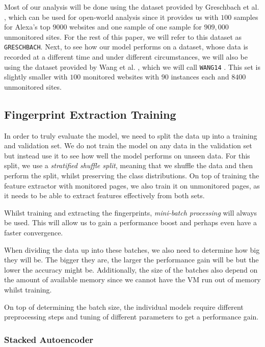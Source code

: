 Most of our analysis will be done using the dataset provided by Greschbach et al. \cite{greschbach2016effect}, which can be used for open-world analysis since it provides us with $100$ samples for Alexa's top $9000$ websites and one sample of one sample for $909,000$ unmonitored sites.
For the rest of this paper, we will refer to this dataset as \texttt{GRESCHBACH}.
Next, to see how our model performs on a dataset, whose data is recorded at a different time and under different circumstances, we will also be using the dataset provided by Wang et al. \cite{wang_cai_johnson_nithyanand_goldberg_2014}, which we will call \texttt{WANG14} \cite{panchenko2}.
This set is slightly smaller with $100$ monitored websites with $90$ instances each and $8400$ unmonitored sites.

\subsection{Fingerprint Extraction Training} \label{sec:fingerprint-extraction-training}

In order to truly evaluate the model, we need to split the data up into a training and validation set.
We do not train the model on any data in the validation set but instead use it to see how well the model performs on unseen data.
For this split, we use a \textit{stratified shuffle split}, meaning that we shuffle the data and then perform the split, whilst preserving the class distributions.
On top of training the feature extractor with monitored pages, we also train it on unmonitored pages, as it needs to be able to extract features effectively from both sets.

Whilst training and extracting the fingerprints, \textit{mini-batch processing} will always be used.
This will allow us to gain a performance boost and perhaps even have a faster convergence.

When dividing the data up into these batches, we also need to determine how big they will be.
The bigger they are, the larger the performance gain will be but the lower the accuracy might be.
Additionally, the size of the batches also depend on the amount of available memory since we cannot have the VM run out of memory whilst training.

On top of determining the batch size, the individual models require different preprocessing steps and tuning of different parameters to get a performance gain.

\subsubsection{Stacked Autoencoder}


